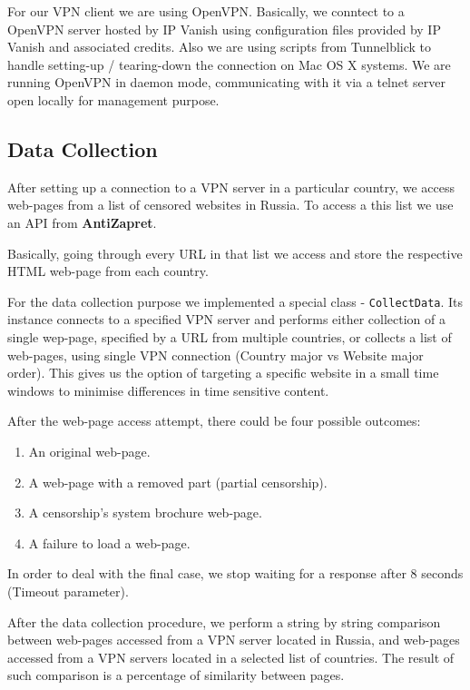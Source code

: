 \documentclass[conference]{IEEEtran}
\newcommand{\code}[1]{\texttt{#1}}
\begin{document}
For our VPN client we are using OpenVPN. 
Basically, we conntect to a OpenVPN server hosted by IP Vanish using configuration files provided by IP Vanish and associated credits.
Also we are using scripts from Tunnelblick to handle setting-up / tearing-down the connection on Mac OS X systems.
We are running OpenVPN in daemon mode, communicating with it via a telnet server open locally for management purpose.

\subsection{Data Collection}
After setting up a connection to a VPN server in a particular country, we access web-pages from a list of censored websites in Russia. To access a this list we use an API from \textbf{AntiZapret}. 

Basically, going through every URL in that list we access and store the respective HTML web-page from each country. 

For the data collection purpose we implemented a special class - \code{CollectData}. Its instance connects to a specified VPN server and performs either collection of a single wep-page, specified by a URL from multiple countries, or collects a list of web-pages, using single VPN connection (Country major vs Website major order).
This gives us the option of targeting a specific website in a small time windows to minimise differences in time sensitive content. 

After the web-page access attempt, there could be four possible outcomes:
\begin{enumerate}
\item An original web-page.
\item A web-page with a removed part (partial censorship).
\item A censorship's system brochure web-page.
\item A failure to load a web-page.
\end{enumerate}
In order to deal with the final case, we stop waiting for a response after 8 seconds (Timeout parameter).


After the data collection procedure, we perform a string by string comparison between web-pages accessed from a VPN server located in Russia, and web-pages accessed from a VPN servers located in a selected list of countries. The result of such comparison is a percentage of similarity between pages. 
\end{document}
